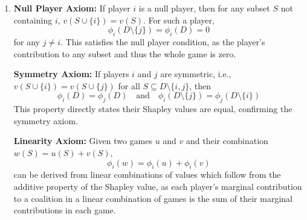 \documentclass[
	12pt, %
]{fphw}
\begin{document}
\begin{enumerate}
\item \textbf{Null Player Axiom:}
If player \(i\) is a null player, then for any subset \(S\) not containing \(i\), \(v(S \cup \{i\}) = v(S)\). For such a player, 
\[
\phi_i(D \setminus \{j\}) = \phi_i(D) = 0
\]
for any \(j \neq i\). This satisfies the null player condition, as the player's contribution to any subset and thus the whole game is zero.

\textbf{Symmetry Axiom:}
If players \(i\) and \(j\) are symmetric, i.e., \(v(S \cup \{i\}) = v(S \cup \{j\})\) for all \(S \subseteq D \setminus \{i, j\}\), then
\[
\phi_i(D) = \phi_j(D) \quad \text{and} \quad \phi_i(D \setminus \{j\}) = \phi_j(D \setminus \{i\})
\]
This property directly states their Shapley values are equal, confirming the symmetry axiom.

\textbf{Linearity Axiom:}
Given two games \(u\) and \(v\) and their combination \(w(S) = u(S) + v(S)\),
\[
\phi_i(w) = \phi_i(u) + \phi_i(v)
\]
can be derived from linear combinations of values which follow from the additive property of the Shapley value, as each player's marginal contribution to a coalition in a linear combination of games is the sum of their marginal contributions in each game.

\end{enumerate}
\end{document}
